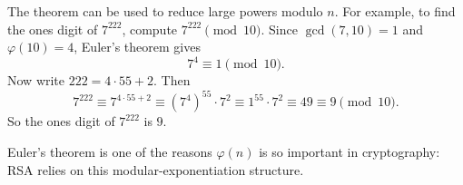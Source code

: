 The theorem can be used to reduce large powers modulo \(n\).  For example, to
find the ones digit of \(7^{222}\), compute \(7^{222}\pmod{10}\).  Since
\(\gcd(7,10)=1\) and \(\varphi(10)=4\), Euler's theorem gives
\[
  7^4 \equiv 1 \pmod{10}.
\]
Now write \(222 = 4\cdot 55 + 2\).  Then
\[
  7^{222}
  \equiv 7^{4\cdot 55 + 2}
  \equiv (7^4)^{55}\cdot 7^2
  \equiv 1^{55}\cdot 7^2
  \equiv 49
  \equiv 9 \pmod{10}.
\]
So the ones digit of \(7^{222}\) is \(9\).



Euler's theorem is one of the reasons \(\varphi(n)\) is so important in
cryptography: RSA relies on this modular-exponentiation structure.
